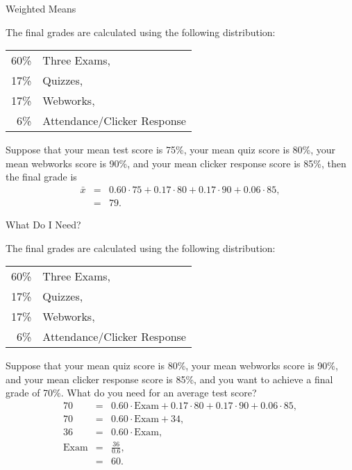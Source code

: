 \begin{frame}{Weighted Means}

  The final grades are calculated using the following distribution:
  \begin{tabular}[t]{rl}
    60\% & Three Exams, \\
    17\% & Quizzes, \\
    17\% & Webworks, \\
    6\%  & Attendance/Clicker Response \\
  \end{tabular}

  Suppose that your mean test score is 75\%, your mean quiz score is
  80\%, your mean webworks score is 90\%, and your mean clicker
  response score is 85\%, then the final grade is
  \begin{eqnarray*}
    \bar{x} & = & 0.60\cdot 75 + 0.17\cdot 80 + 0.17\cdot 90 + 0.06\cdot 85, \\
    & = & 79.
  \end{eqnarray*}

  
\end{frame}

\begin{frame}{What Do I Need?}

  The final grades are calculated using the following distribution:
  \begin{tabular}[t]{rl}
    60\% & Three Exams, \\
    17\% & Quizzes, \\
    17\% & Webworks, \\
    6\%  & Attendance/Clicker Response \\
  \end{tabular}

  Suppose that your mean quiz score is 80\%, your mean webworks score
  is 90\%, and your mean clicker response score is 85\%, and you want to achieve a 
  final grade of 70\%. What do you need for an average test score?
  \begin{eqnarray*}
    70 & = & 0.60\cdot \mathrm{Exam} + 0.17\cdot 80 + 0.17\cdot 90 + 0.06\cdot 85, \\
    70 & = &  0.60\cdot \mathrm{Exam} + 34, \\
    36 & = &  0.60\cdot \mathrm{Exam}, \\
    \mathrm{Exam} & = & \frac{36}{0.6}, \\
    & = & 60.
  \end{eqnarray*}

  
\end{frame}


